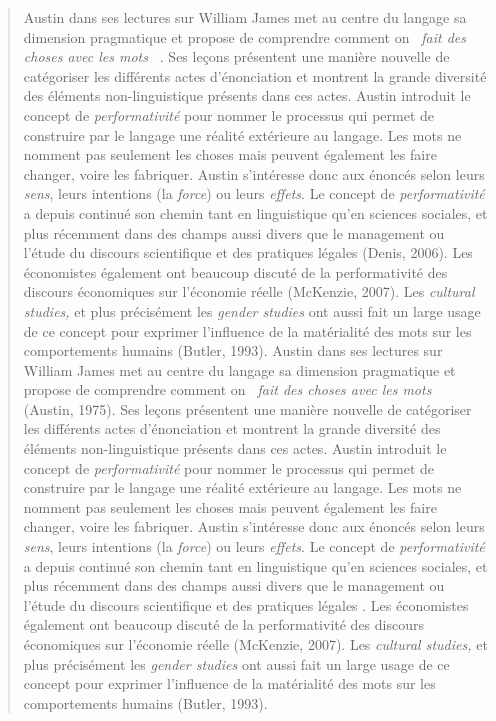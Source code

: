 \begin{quote}
Austin dans ses lectures sur William James met au centre du langage sa dimension pragmatique et propose de comprendre comment on \textit{{\guillemotleft}~fait des choses avec les mots~{\guillemotright}} \cite{Austin1975}. Ses le\c{c}ons pr\'esentent une mani\`ere nouvelle de cat\'egoriser les diff\'erents actes d{\textquoteright}\'enonciation et montrent la grande diversit\'e des \'el\'ements non-linguistique pr\'esents dans ces actes. Austin introduit le concept de \textit{performativit\'e }pour nommer le processus qui permet de construire par le langage une r\'ealit\'e ext\'erieure au langage. Les mots ne nomment pas seulement les choses mais peuvent \'egalement les faire changer, voire les fabriquer. Austin s{\textquoteright}int\'eresse donc aux \'enonc\'es selon leurs \textit{sens}, leurs intentions (la \textit{force}) ou leurs \textit{effets}. Le concept de \textit{performativit\'e }a depuis continu\'e son chemin tant en linguistique qu{\textquoteright}en sciences sociales, et plus r\'ecemment dans des champs aussi divers que le management ou l{\textquoteright}\'etude du discours scientifique et des pratiques l\'egales (Denis, 2006). Les \'economistes \'egalement ont beaucoup discut\'e de la performativit\'e des discours \'economiques sur l{\textquoteright}\'economie r\'eelle (McKenzie, 2007). Les \textit{cultural studies,} et plus pr\'ecis\'ement les \textit{gender studies }ont aussi fait un large usage de ce concept pour exprimer l{\textquoteright}influence de la mat\'erialit\'e des mots sur les comportements humains (Butler, 1993).  
Austin dans ses lectures sur William James met au centre du langage sa dimension pragmatique et propose de comprendre comment on \textit{{\guillemotleft}~fait des choses avec les mots~{\guillemotright}} (Austin, 1975). Ses le\c{c}ons pr\'esentent une mani\`ere nouvelle de cat\'egoriser les diff\'erents actes d{\textquoteright}\'enonciation et montrent la grande diversit\'e des \'el\'ements non-linguistique pr\'esents dans ces actes. Austin introduit le concept de \textit{performativit\'e }pour nommer le processus qui permet de construire par le langage une r\'ealit\'e ext\'erieure au langage. Les mots ne nomment pas seulement les choses mais peuvent \'egalement les faire changer, voire les fabriquer. Austin s{\textquoteright}int\'eresse donc aux \'enonc\'es selon leurs \textit{sens}, leurs intentions (la \textit{force}) ou leurs \textit{effets}. Le concept de \textit{performativit\'e }a depuis continu\'e son chemin tant en linguistique qu{\textquoteright}en sciences sociales, et plus r\'ecemment dans des champs aussi divers que le management ou l{\textquoteright}\'etude du discours scientifique et des pratiques l\'egales \cite{Denis2006}. Les \'economistes \'egalement ont beaucoup discut\'e de la performativit\'e des discours \'economiques sur l{\textquoteright}\'economie r\'eelle (McKenzie, 2007). Les \textit{cultural studies,} et plus pr\'ecis\'ement les \textit{gender studies }ont aussi fait un large usage de ce concept pour exprimer l{\textquoteright}influence de la mat\'erialit\'e des mots sur les comportements humains (Butler, 1993).  

\end{quote}
